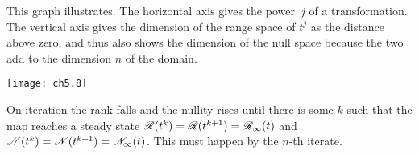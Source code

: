 This graph illustrates.
The horizontal axis gives the power~$j$ of a transformation.
The vertical axis gives
the dimension of the range space of $t^j$
as the distance above zero, and thus also shows the dimension of the 
null space because the two add to the dimension $n$ of the domain.
\begin{center}
  \texttt{[image: ch5.8]}
\end{center}
On iteration 
the rank falls and the nullity rises
until there is some $k$ such that 
the map reaches a steady state
$\mathscr{R}(t^k)=\mathscr{R}(t^{k+1})=\mathscr{R}_\infty(t)$
and $\mathscr{N}(t^k)=\mathscr{N}(t^{k+1})=\mathscr{N}_\infty(t)$.
This must happen by the $n$-th iterate.


